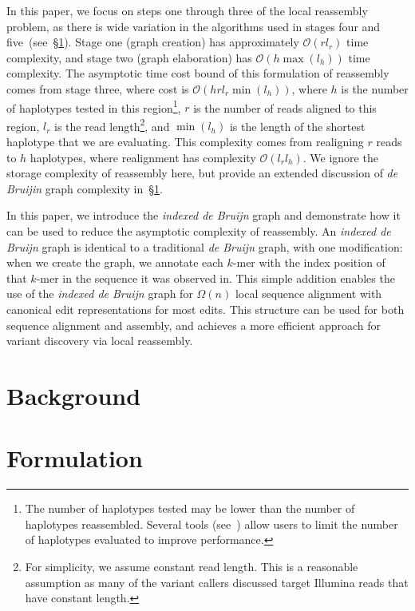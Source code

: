 \documentclass[11pt]{article}
\begin{document}
In this paper, we focus on steps one through three of the local reassembly problem, as there is wide
variation in the algorithms used in stages four and five~(see~\S\ref{sec:background}). Stage one (graph
creation) has approximately $\mathcal{O}(r l_r)$ time complexity, and stage two (graph elaboration) has
$\mathcal{O}(h \max(l_h))$ time complexity.
The asymptotic time cost bound of this formulation of reassembly comes from stage three, where cost is $\mathcal{O}(h r l_r
\min(l_h))$, where $h$ is the number of haplotypes tested in this region\footnote{The number of
haplotypes tested may be lower than the number of haplotypes reassembled. Several tools
(see~\cite{depristo11,garrison12}) allow users to limit the number of haplotypes evaluated to improve
performance.}, $r$ is the number of reads aligned to this region, $l_r$ is the read length\footnote{For
simplicity, we assume constant read length. This is a reasonable assumption as many of the variant
callers discussed target Illumina reads that have constant length.}, and $\min(l_h)$ is the length of the
shortest haplotype that we are evaluating. This complexity comes from realigning $r$ reads to $h$
haplotypes, where realignment has complexity $\mathcal{O}(l_r l_h)$. We ignore the storage complexity of
reassembly here, but provide an extended
discussion of \emph{de Bruijin} graph complexity in~\S\ref{sec:background}.

In this paper, we introduce the \emph{indexed de Bruijn} graph and demonstrate how it can be used to
reduce the asymptotic complexity of reassembly. An \emph{indexed de Bruijn} graph is identical to a
traditional \emph{de Bruijn} graph, with one modification: when we create the graph, we annotate each
$k$-mer with the index position of that $k$-mer in the sequence it was observed in. This simple addition
enables the use of the \emph{indexed de Bruijn} graph for $\Omega(n)$ local sequence alignment with
canonical edit representations for most edits. This structure can be used for both sequence alignment and
assembly, and achieves a more efficient approach for variant discovery via local reassembly.

\section{Background}
\label{sec:background}

\section{Formulation}
\label{sec:formulation}
\end{document}
